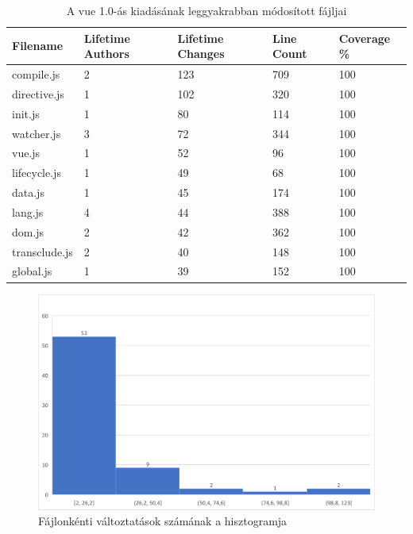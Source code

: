 \begin{table}[h]
    \centering
    \begin{tabular}{l|l|l|l|l}
        Filename      & Lifetime Authors & Lifetime Changes & Line Count & Coverage \% \\ \hline
        compile.js    & 2                & 123              & 709        & 100         \\
        directive.js  & 1                & 102              & 320        & 100         \\
        init.js       & 1                & 80               & 114        & 100         \\
        watcher.js    & 3                & 72               & 344        & 100         \\
        vue.js        & 1                & 52               & 96         & 100         \\
        lifecycle.js  & 1                & 49               & 68         & 100         \\
        data.js       & 1                & 45               & 174        & 100         \\
        lang.js       & 4                & 44               & 388        & 100         \\
        dom.js        & 2                & 42               & 362        & 100         \\
        transclude.js & 2                & 40               & 148        & 100         \\
        global.js     & 1                & 39               & 152        & 100
    \end{tabular}
    \caption{A vue 1.0-ás kiadásának leggyakrabban módosított fájljai} \label{table:vue1-top-files}
\end{table}

\begin{figure}[H]
    \centering
    \includegraphics[width=1\textwidth]{images/vue/vue1-hist.png}
    \caption{Fájlonkénti változtatások számának a hisztogramja}
    \label{fig:vue1-hist}
\end{figure}

